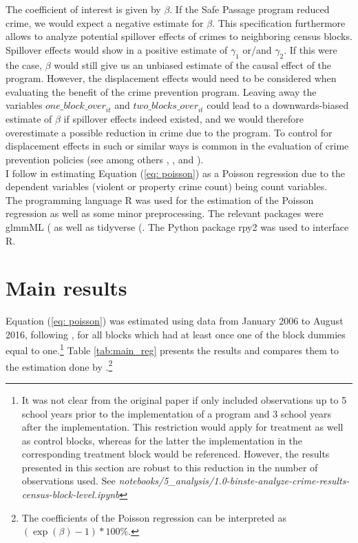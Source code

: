 \documentclass[]{article}
\begin{document}
The coefficient of interest is given by $\beta$. If the Safe Passage program reduced crime, we would expect a negative estimate for $\beta$. This specification furthermore allows to analyze potential spillover effects of crimes to neighboring census blocks. Spillover effects would show in a positive estimate of $\gamma_1$ or/and $\gamma_2$. If this were the case, $\beta$ would still give us an unbiased estimate of the causal effect of the program. However, the displacement effects would need to be considered when evaluating the benefit of the crime prevention program. Leaving away the variables $\textit{one\_block\_over}_{it}$ and $\textit{two\_blocks\_over}_{it}$ could lead to a downwards-biased estimate of $\beta$ if spillover effects indeed existed, and we would therefore overestimate a possible reduction in crime due to the program. To control for displacement effects in such or similar ways is common in the evaluation of crime prevention policies (see among others \citealt{grogger2002effects}, \citealt{di2004police}, and \citealt{draca2011panic}). \\

I follow \cite{mcmillen2017} in estimating Equation (\ref{eq: poisson}) as a Poisson regression due to the dependent variables (violent or property crime count) being count variables.  \\

The programming language R was used for the estimation of the Poisson regression as well as some minor preprocessing. The relevant packages were glmmML (\citealt{glmmml} as well as tidyverse (\citealt{tidyverse}. The Python package rpy2 was used to interface R.

\section{Main results}
\label{sec: mainresults}
Equation (\ref{eq: poisson}) was estimated using data from January 2006 to August 2016, following \cite{mcmillen2017}, for all blocks which had at least once one of the block dummies equal to one.\footnote{It was not clear from the original paper if \cite{mcmillen2017} only included observations up to 5 school years prior to the implementation of a program and 3 school years after the implementation. This restriction would apply for treatment as well as control blocks, whereas for the latter the implementation in the corresponding treatment block would be referenced. However, the results presented in this section are robust to this reduction in the number of observations used. See \textit{notebooks/5\_analysis/1.0-binste-analyze-crime-results-census-block-level.ipynb}} Table \ref{tab:main_reg} presents the results and compares them to the estimation done by \cite{mcmillen2017}.\footnote{The coefficients of the Poisson regression can be interpreted as $(\exp(\beta) - 1) * 100\%$.}
\end{document}
